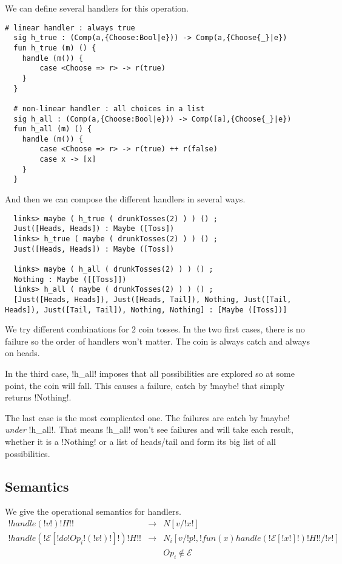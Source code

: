 \documentclass[11pt, nonacm=true, language=french, language=english]{acmart}
\begin{document}
We can define several handlers for this operation.

\begin{lstlisting}[caption=Toss handlers]
  # linear handler : always true
  sig h_true : (Comp(a,{Choose:Bool|e})) -> Comp(a,{Choose{_}|e})
  fun h_true (m) () {
    handle (m()) {
        case <Choose => r> -> r(true)
    }
  }

  # non-linear handler : all choices in a list
  sig h_all : (Comp(a,{Choose:Bool|e})) -> Comp([a],{Choose{_}|e})
  fun h_all (m) () {
    handle (m()) {
        case <Choose => r> -> r(true) ++ r(false)
        case x -> [x]
    }
  }
\end{lstlisting}

And then we can compose the different handlers in several ways.

\begin{lstlisting}
  links> maybe ( h_true ( drunkTosses(2) ) ) () ;
  Just([Heads, Heads]) : Maybe ([Toss])
  links> h_true ( maybe ( drunkTosses(2) ) ) () ;
  Just([Heads, Heads]) : Maybe ([Toss])

  links> maybe ( h_all ( drunkTosses(2) ) ) () ;
  Nothing : Maybe ([[Toss]])
  links> h_all ( maybe ( drunkTosses(2) ) ) () ;
  [Just([Heads, Heads]), Just([Heads, Tail]), Nothing, Just([Tail, Heads]), Just([Tail, Tail]), Nothing, Nothing] : [Maybe ([Toss])]
\end{lstlisting}

We try different combinations for 2 coin tosses. In the two first cases, there is no failure so the order of handlers won't matter. The coin is always catch and always on heads.

In the third case, !h_all! imposes that all possibilities are explored so at some point, the coin will fall. This causes a failure, catch by !maybe! that simply returns !Nothing!.

The last case is the most complicated one. The failures are catch by !maybe! \emph{under} !h_all!. That means !h_all! won't see failures and will take each result, whether it is a !Nothing! or a list of heads/tail and form its big list of all possibilities.


\subsection{Semantics}
\label{sec:semantics}

We give the operational semantics for handlers.
\[
  \begin{array}{rcl}
    !handle ( !v! ) { !H! }! & \longrightarrow & N[v/!x!] \\
    !handle ( !\mathcal E[!do !Op_{i}!( !v! )!]! ) { !H! }! & \longrightarrow & N_{i}[v/!p!, !fun (x)  { handle ( !\mathcal E[!x!] ! ) { !H! } }!/!r!] \\
                                                                             && Op_{i} \notin \mathcal E\\
  \end{array}
\]
\end{document}
